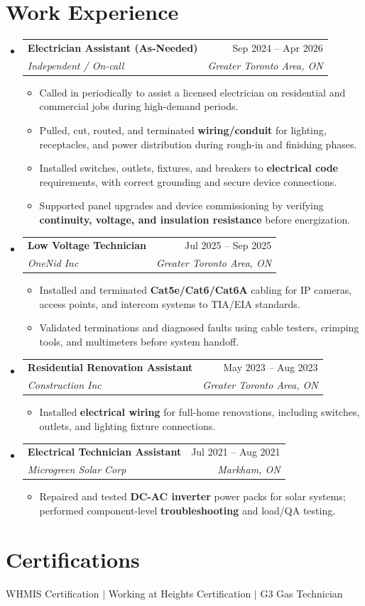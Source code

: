 \documentclass[letterpaper,11pt]{article}
\makeatletter
\newcommand{\resumeItem}[1]{\item\small{{#1 \vspace{-2pt}}}}
\newcommand{\resumeSubheading}[4]{
  \vspace{-4pt}\item
    \begin{tabular*}{0.97\textwidth}[t]{l@{\extracolsep{\fill}}r}
      \textbf{#1} & #2 \\
      \textit{\small #3} & \textit{\small #4} \\
    \end{tabular*}\vspace{-8pt}
}
\newcommand{\resumeSubHeadingListStart}{\begin{itemize}[leftmargin=0.15in, label={}]}
\newcommand{\resumeSubHeadingListEnd}{\end{itemize}}
\newcommand{\resumeItemListStart}{\begin{itemize}}
\newcommand{\resumeItemListEnd}{\end{itemize}\vspace{-5pt}}
\makeatother
\begin{document}
\section{Work Experience}
\resumeSubHeadingListStart

\resumeSubheading
  {Electrician Assistant (As-Needed)}{Sep 2024 -- Apr 2026}
  {Independent / On-call}{Greater Toronto Area, ON}
\resumeItemListStart
  \resumeItem{Called in periodically to assist a licensed electrician on residential and commercial jobs during high-demand periods.}
  \resumeItem{Pulled, cut, routed, and terminated \textbf{wiring/conduit} for lighting, receptacles, and power distribution during rough-in and finishing phases.}
  \resumeItem{Installed switches, outlets, fixtures, and breakers to \textbf{electrical code} requirements, with correct grounding and secure device connections.}
  \resumeItem{Supported panel upgrades and device commissioning by verifying \textbf{continuity, voltage, and insulation resistance} before energization.}
\resumeItemListEnd

\resumeSubheading
  {Low Voltage Technician}{Jul 2025 -- Sep 2025}
  {OneNid Inc}{Greater Toronto Area, ON}
\resumeItemListStart
  \resumeItem{Installed and terminated \textbf{Cat5e/Cat6/Cat6A} cabling for IP cameras, access points, and intercom systems to TIA/EIA standards.}
  \resumeItem{Validated terminations and diagnosed faults using cable testers, crimping tools, and multimeters before system handoff.}
\resumeItemListEnd

\resumeSubheading
  {Residential Renovation Assistant}{May 2023 -- Aug 2023}
  {Construction Inc}{Greater Toronto Area, ON}
\resumeItemListStart
  \resumeItem{Installed \textbf{electrical wiring} for full-home renovations, including switches, outlets, and lighting fixture connections.}
\resumeItemListEnd

\resumeSubheading
  {Electrical Technician Assistant}{Jul 2021 -- Aug 2021}
  {Microgreen Solar Corp}{Markham, ON}
\resumeItemListStart
  \resumeItem{Repaired and tested \textbf{DC-AC inverter} power packs for solar systems; performed component-level \textbf{troubleshooting} and load/QA testing.}
\resumeItemListEnd

\resumeSubHeadingListEnd

\section{Certifications}
WHMIS Certification $\vert$ Working at Heights Certification $\vert$ G3 Gas Technician
\end{document}
